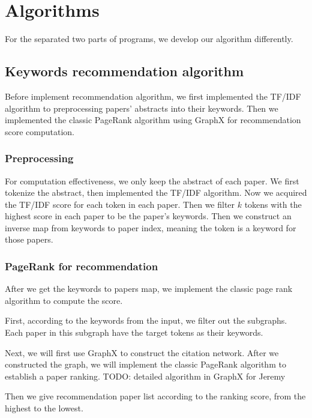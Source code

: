 \section{Algorithms}

For the separated two parts of programs, we develop our algorithm differently. 

\subsection{Keywords recommendation algorithm}

Before implement recommendation algorithm, we first implemented the TF/IDF algorithm to preprocessing papers' abstracts into their keywords. Then we implemented the classic PageRank algorithm using GraphX for recommendation score computation.

\subsubsection{Preprocessing}

For computation effectiveness, we only keep the abstract of each paper. We first tokenize the abstract, then implemented the TF/IDF algorithm. Now we acquired the TF/IDF score for each token in each paper. Then we filter $k$ tokens with the highest score in each paper to be the paper's keywords. Then we construct an inverse map from keywords to paper index, meaning the token is a keyword for those papers. 

\subsubsection{PageRank for recommendation}

After we get the keywords to papers map, we implement the classic page rank algorithm to compute the score. 

First, according to the keywords from the input, we filter out the subgraphs. Each paper in this subgraph have the target tokens as their keywords. 

Next, we will first use GraphX to construct the citation network.  After we constructed the graph, we will implement the classic PageRank algorithm to establish a paper ranking. {TODO: detailed algorithm in GraphX for Jeremy}

Then we give recommendation paper list according to the ranking score, from the highest to the lowest.

